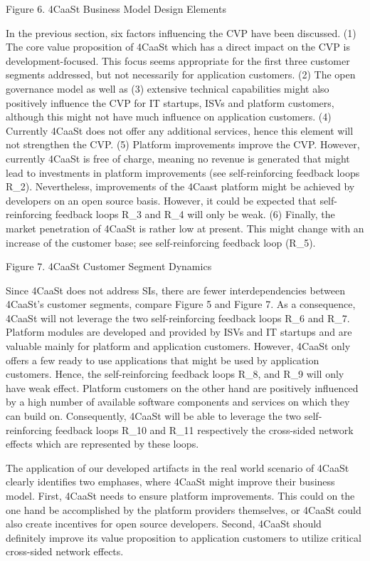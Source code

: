 Figure 6. 4CaaSt Business Model Design Elements

In the previous section, six factors influencing the CVP have been discussed. (1) The core value proposition of 4CaaSt which has a direct impact on the CVP is development-focused. This focus seems appropriate for the first three customer segments addressed, but not necessarily for application customers. (2) The open governance model as well as (3) extensive technical capabilities might also positively influence the CVP for IT startups, ISVs and platform customers, although this might not have much influence on application customers. (4) Currently 4CaaSt does not offer any additional services, hence this element will not strengthen the CVP. (5) Platform improvements improve the CVP. However, currently 4CaaSt is free of charge, meaning no revenue is generated that might lead to investments in platform improvements (see self-reinforcing feedback loops R\_2). Nevertheless, improvements of the 4Caast platform might be achieved by developers on an open source basis. However, it could be expected that self-reinforcing feedback loops R\_3 and R\_4 will only be weak. (6) Finally, the market penetration of 4CaaSt is rather low at present. This might change with an increase of the customer base; see self-reinforcing feedback loop (R\_5).
 
Figure 7. 4CaaSt Customer Segment Dynamics

Since 4CaaSt does not address SIs, there are fewer interdependencies between 4CaaSt's customer segments, compare Figure 5 and Figure 7. As a consequence, 4CaaSt will not leverage the two self-reinforcing feedback loops R\_6 and R\_7. Platform modules are developed and provided by ISVs and IT startups and are valuable mainly for platform and application customers. However, 4CaaSt only offers a few ready to use applications that might be used by application customers. Hence, the self-reinforcing feedback loops R\_8, and R\_9 will only have weak effect. Platform customers on the other hand are positively influenced by a high number of available software components and services on which they can build on. Consequently, 4CaaSt will be able to leverage the two self-reinforcing feedback loops R\_10 and R\_11 respectively the cross-sided network effects which are represented by these loops. 

The application of our developed artifacts in the real world scenario of 4CaaSt clearly identifies two emphases, where 4CaaSt might improve their business model. First, 4CaaSt needs to ensure platform improvements. This could on the one hand be accomplished by the platform providers themselves, or 4CaaSt could also create incentives for open source developers. Second, 4CaaSt should definitely improve its value proposition to application customers to utilize critical cross-sided network effects.
